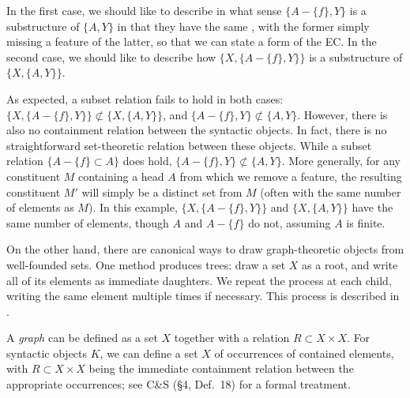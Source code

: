 \documentclass[output=paper]{langsci/langscibook}
\begin{document}
In the first case, we should like to describe in what sense $\{A-\{f\},Y\}$ is
a substructure of $\{A,Y\}$ in that they have the same ,
with the former simply missing a feature of the latter, so that we can state a
form of the \gls{EC}. In the second case, we should
like to describe how $\{X,\{A-\{f\},Y\}\}$ is a substructure of
$\{X,\{A,Y\}\}$.

As expected, a subset relation fails to hold in both cases:
$\{X,\{A-\{f\},Y\}\}\not\subset\{X,\{A,Y\}\}$, and
$\{A-\{f\},Y\}\not\subset\{A,Y\}$. However, there is also no containment
relation between the syntactic objects. In fact, there is no straightforward
set-theoretic relation between these objects. While a subset relation
$\{A-\{f\}\subset A\}$ does hold, $\{A-\{f\},Y\}\not\subset\{A,Y\}$. More
generally, for any constituent $M$ containing a head $A$ from which we remove a
feature, the resulting constituent $M'$ will simply be a distinct set
from $M$ (often with the same number of elements as $M$). In this example,
$\{X,\{A-\{f\},Y\}\}$ and $\{X,\{A,Y\}\}$ have the same number of elements,
though $A$ and $A-\{f\}$ do not, assuming $A$ is finite.

On the other hand, there are canonical ways to draw graph-theoretic objects
from well-founded sets. One method produces trees: draw a set $X$ as a root,
and write all of its elements as immediate daughters. We repeat the process at
each child, writing the same element multiple times if necessary. This process
is described in \citet{aczel}.

\ea\label{ex:aczel}
    \hspace*{-.75cm}
\z

A \emph{graph} can be defined as a set $X$ together with a relation $R\subset
X\times X$. For syntactic objects $K$, we can define a set $X$ of occurrences
of contained elements, with $R\subset X\times X$ being the immediate
containment relation between the appropriate occurrences; see
C\&S (\S 4, Def.\ 18) for a formal treatment.
\end{document}
